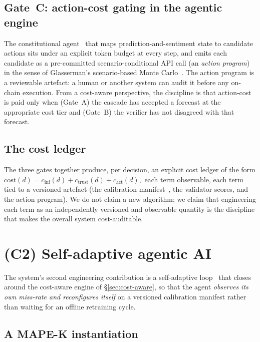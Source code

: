 \documentclass[11pt,a4paper]{article}
\begin{document}
\subsection{Gate~C: action-cost gating in the agentic engine}\label{sec:cost-aware:scenario}

The constitutional agent~\cite{bai2022constitutional} that maps
prediction-and-sentiment state to candidate actions sits under an
explicit token budget at every step, and emits each candidate as a
pre-committed scenario-conditional API call (an \emph{action program})
in the sense of Glasserman's scenario-based Monte
Carlo~\cite{glasserman2003monte}. The action program is a reviewable
artefact: a human or another system can audit it before any on-chain
execution. From a cost-aware perspective, the discipline is that
action-cost is paid only when (Gate~A) the cascade has accepted a
forecast at the appropriate cost tier and (Gate~B) the verifier has not
disagreed with that forecast.

\subsection{The cost ledger}\label{sec:cost-aware:ledger}

The three gates together produce, per decision, an explicit cost ledger
of the form
\(\mathrm{cost}(d) = c_{\text{inf}}(d) + c_{\text{trust}}(d)
+ c_{\text{act}}(d),\)
each term observable, each term tied to a versioned artefact (the
calibration manifest~\cite{omnirisk2026calibration,omnirisk2026predmetrics},
the validator scores, and the action program). We do not claim a new
algorithm; we claim that engineering each term as an independently
versioned and observable quantity is the discipline that makes the
overall system cost-auditable.

\section{(C2) Self-adaptive agentic AI}\label{sec:self-adaptive}

The system's second engineering contribution is a self-adaptive
loop~\cite{salehie2009self,weyns2020introduction} that closes around the
cost-aware engine of \S\ref{sec:cost-aware}, so that the agent
\emph{observes its own miss-rate and reconfigures itself} on a versioned
calibration manifest rather than waiting for an offline retraining cycle.

\subsection{A MAPE-K instantiation}\label{sec:self-adaptive:mapek}
\end{document}
